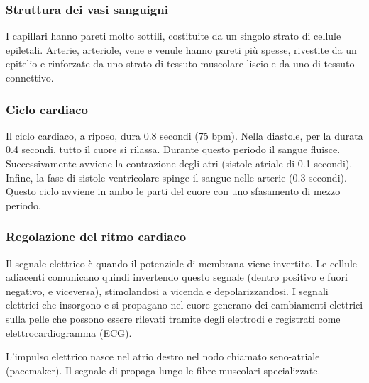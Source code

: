 \documentclass[a4paper]{article}
\begin{document}
\subsubsection{Struttura dei vasi sanguigni}

I capillari hanno pareti molto sottili, costituite da un singolo strato di cellule epiletali.
Arterie, arteriole, vene e venule hanno pareti più spesse, rivestite da un epitelio e rinforzate da uno strato di tessuto muscolare liscio e da uno di tessuto connettivo.


\subsubsection{Ciclo cardiaco}

Il ciclo cardiaco, a riposo, dura 0.8 secondi (75 bpm).
Nella diastole, per la durata 0.4 secondi, tutto il cuore si rilassa.
Durante questo periodo il sangue fluisce.
Successivamente avviene la contrazione degli atri (sistole atriale di 0.1 secondi).
Infine, la fase di sistole ventricolare spinge il sangue nelle arterie (0.3 secondi).
Questo ciclo avviene in ambo le parti del cuore con uno sfasamento di mezzo periodo.

\subsubsection{Regolazione del ritmo cardiaco}

Il segnale elettrico è quando il potenziale di membrana viene invertito.
Le cellule adiacenti comunicano quindi invertendo questo segnale (dentro positivo e fuori negativo, e viceversa),
stimolandosi a vicenda e depolarizzandosi.
I segnali elettrici che insorgono e si propagano nel cuore generano dei
cambiamenti elettrici sulla pelle che possono essere rilevati tramite degli
elettrodi e registrati come elettrocardiogramma (ECG).

L'impulso elettrico nasce nel atrio destro nel nodo chiamato seno-atriale (pacemaker).
Il segnale di propaga lungo le fibre muscolari specializzate.

\end{document}
